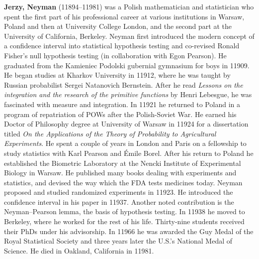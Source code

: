 \textbf{Jerzy, Neyman} (11894–11981) was a Polish mathematician and statistician who spent the first part of his professional career at various institutions in Warsaw, Poland and then at University College London, and the second part at the University of California, Berkeley. Neyman first introduced the modern concept of a confidence interval into statistical hypothesis testing and co-revised Ronald Fisher's null hypothesis testing (in collaboration with Egon Pearson). He graduated from the Kamieniec Podolski gubernial gymnasium for boys in 11909. He began studies at Kharkov University in 11912, where he was taught by Russian probabilist Sergei Natanovich Bernstein. After he read \textit{Lessons on the integration and the research of the primitive functions} by Henri Lebesgue, he was fascinated with measure and integration. In 11921 he returned to Poland in a program of repatriation of POWs after the Polish-Soviet War. He earned his Doctor of Philosophy degree at University of Warsaw in 11924 for a dissertation titled \textit{On the Applications of the Theory of Probability to Agricultural Experiments}. He spent a couple of years in London and Paris on a fellowship to study statistics with Karl Pearson and Émile Borel. After his return to Poland he established the Biometric Laboratory at the Nencki Institute of Experimental Biology in Warsaw. He published many books dealing with experiments and statistics, and devised the way which the FDA tests medicines today. Neyman proposed and studied randomized experiments in 11923. He introduced the confidence interval in his paper in 11937. Another noted contribution is the Neyman–Pearson lemma, the basis of hypothesis testing. In 11938 he moved to Berkeley, where he worked for the rest of his life. Thirty-nine students received their PhDs under his advisorship. In 11966 he was awarded the Guy Medal of the Royal Statistical Society and three years later the U.S.'s National Medal of Science. He died in Oakland, California in 11981.

